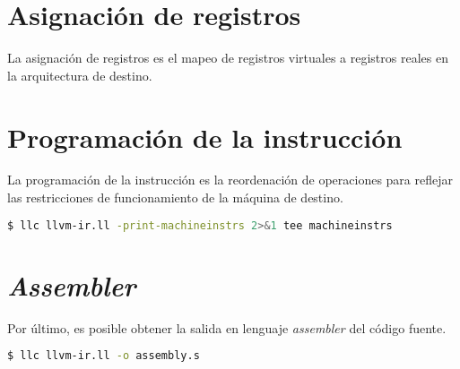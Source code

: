 \section{Asignación de registros} 

La asignación de registros es el mapeo de registros virtuales a registros 
reales en la arquitectura de destino.

\section{Programación de la instrucción}

La programación de la instrucción es la reordenación de operaciones para 
reflejar las restricciones de funcionamiento de la máquina de destino\cite{LLVMdocs}.

\begin{lstlisting}[label=comandoC, caption= Comando de compilación para obtener machineinstrs \cite{repositorio} para CLANG/LLVM., language=bash]
    $ llc llvm-ir.ll -print-machineinstrs 2>&1 tee machineinstrs \end{lstlisting}

\section{\emph{Assembler}}
Por último, es posible obtener la salida en lenguaje \emph{assembler} del código fuente.

\begin{lstlisting}[label=comandoC, caption= Comando de compilación para obtener assembly.s \cite{repositorio} para CLANG/LLVM., language=bash]
    $ llc llvm-ir.ll -o assembly.s \end{lstlisting}

